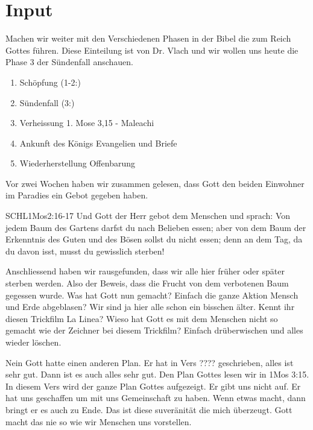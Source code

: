 \documentclass{../../inc/mybib}
\begin{document}
\section{ Input }
\begin{spacing}{1.5}    
    \begin{block}[Einleitung]
        Machen wir weiter mit den Verschiedenen Phasen in der Bibel die zum Reich Gottes führen. Diese Einteilung ist von Dr. Vlach und wir wollen uns heute die Phase 3 der Sündenfall anschauen.
    \end{block}

    \begin{enumerate}
    \item Schöpfung  (1-2:)
    \item Sündenfall  (3:)
    \item Verheissung 1. Mose 3,15 - Maleachi
    \item Ankunft des Königs Evangelien und Briefe
    \item Wiederherstellung Offenbarung
   \end{enumerate}        
    \begin{block}
       Vor zwei Wochen haben wir zusammen gelesen, dass Gott den beiden Einwohner im Paradies ein Gebot gegeben haben.
       \begin{bibelbox}{SCHL}{1Mos}{2:16-17}
            Und Gott der Herr gebot dem Menschen und sprach: \flqq Von jedem Baum des Gartens darfst du nach Belieben essen; aber von dem Baum der Erkenntnis des Guten und des Bösen sollst du nicht essen; denn an dem Tag, da du davon isst, musst du gewisslich sterben!\frqq
        \end{bibelbox}
        Anschliessend haben wir rausgefunden, dass wir alle hier früher oder später sterben werden. Also der Beweis, dass die Frucht von dem verbotenen Baum gegessen wurde. Was hat Gott nun gemacht? Einfach die ganze Aktion Mensch und Erde abgeblasen? Wir sind ja hier alle schon ein bisschen älter. Kennt ihr diesen Trickfilm La Linea? Wieso hat Gott es mit dem Menschen nicht so gemacht wie der Zeichner bei diesem Trickfilm? Einfach drüberwischen und alles wieder löschen.

        Nein Gott hatte einen anderen Plan. Er hat in Vers ???? geschrieben, alles ist sehr gut. Dann ist es auch alles sehr gut. Den Plan Gottes lesen wir in 1Mos 3:15. In diesem Vers wird der ganze Plan Gottes aufgezeigt. Er gibt uns nicht auf. Er hat uns geschaffen um mit uns Gemeinschaft zu haben. Wenn etwas macht, dann bringt er es auch zu Ende. Das ist diese suveränität die mich überzeugt. Gott macht das nie so wie wir Menschen uns vorstellen. 


\end{block}
\end{spacing}
\end{document}
